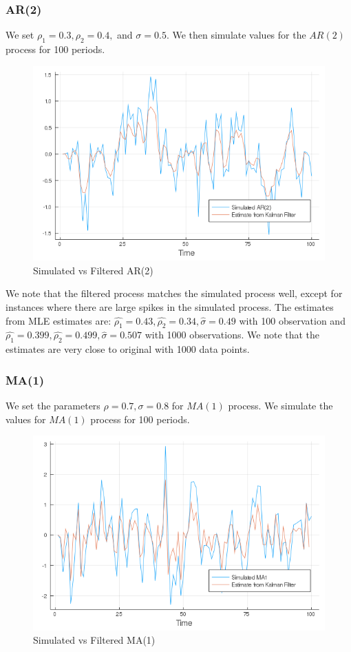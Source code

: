 \documentclass[12pt]{article}
\begin{document}
\subsubsection{AR(2)}
We set $\rho_1 = 0.3, \rho_2 = 0.4,$ and $\sigma=0.5$. We then simulate values for the $AR(2)$ process for 100 periods.
\begin{figure}[h]
\centering
\includegraphics[scale=0.4]{AR2.png}
\caption{Simulated vs Filtered AR(2)}
\end{figure}

We note that the filtered process matches the simulated process well, except for instances where there are large spikes in the simulated process. The estimates from MLE estimates are: $\hat{\rho_1} = 0.43, \hat{\rho_2} = 0.34, \hat{\sigma} =0.49$ with 100 observation and $\hat{\rho_1} = 0.399, \hat{\rho_2} = 0.499, \hat{\sigma} =0.507$ with 1000 observations. We note that the estimates are very close to original with 1000 data points. 

\subsubsection{MA(1)}
We set the parameters $\rho = 0.7, \sigma= 0.8$ for $MA(1)$ process. We simulate the values for $MA(1)$ process for 100 periods.
\begin{figure}[h]
\centering
\includegraphics[scale=0.4]{MA1.png}
\caption{Simulated vs Filtered MA(1)}
\end{figure}
\end{document}
